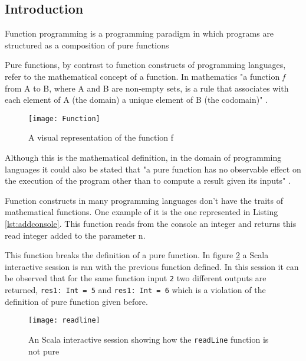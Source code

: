 \documentclass[../main.tex]{subfiles}
\begin{document}
\subsection{Introduction} Function programming is a programming paradigm in
which programs are structured as a composition of pure functions
\autocite{Hughes1989WhyMatters}

Pure functions, by contrast to function constructs of programming languages,
refer to the mathematical concept of a function. In mathematics "a function \textit{f}
from A to B, where A and B are non-empty sets, is a rule that associates with
each element of A (the domain) a unique element of B (the codomain)"
\autocite{NicholsonTheMathematics}.

\begin{figure}[ht]
  \centering \texttt{[image: Function]}
  \caption{\label{fig:label} A visual representation of the function f}
\end{figure}


Although this is the mathematical definition, in the domain of programming
languages it could also be stated that "a pure function has no observable effect
on the execution of the program other than to compute a result given its inputs"
\autocite{Chiusano2013FunctionalScala}.

Function constructs in many programming languages don't have the
traits of mathematical functions. One example of it is the one represented in
Listing \ref{lst:addconsole}. This function reads from the console an integer
and returns this read integer added to the parameter n.



This function breaks the definition of a pure function. In figure
\ref{fig:readLineN} a Scala interactive session is ran with the previous
function defined. In this session it can be observed that for the same function input
\texttt{2} two different outputs are returned, \texttt{res1: Int = 5} and \texttt{res1:
  Int = 6} which is a violation of the definition of pure function given before.

\begin{figure}[ht]
  \centering \texttt{[image: readline]}
  \caption{\label{fig:readLineN} An Scala interactive session showing how the
    \texttt{readLine} function is not pure}
\end{figure}
\end{document}
